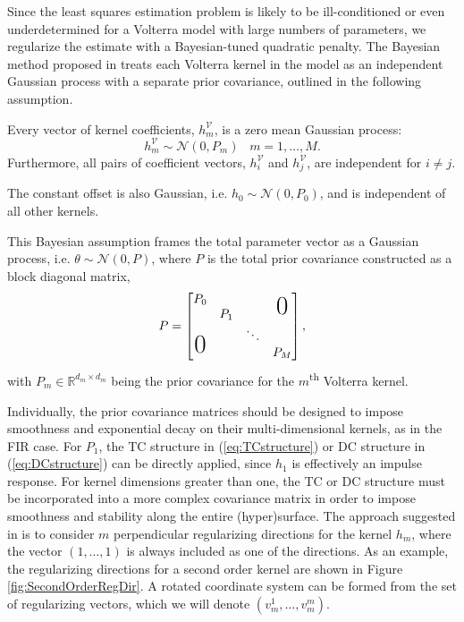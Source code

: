 Since the least squares estimation problem is likely to be ill-conditioned or even underdetermined for a Volterra model with large numbers of parameters, we regularize the estimate with a Bayesian-tuned quadratic penalty. The Bayesian method proposed in \cite{Birpoutsoukis2017} treats each Volterra kernel in the model as an independent Gaussian process with a separate prior covariance, outlined in the following assumption.
\begin{assum}
Every vector of kernel coefficients, $h_m^\mathcal{V}$, is a zero mean Gaussian process: 
\begin{equation}
h_m^\mathcal{V} \sim \mathcal{N}(0,P_m) \; \; \; m = 1, \hdots, M.
\end{equation}
Furthermore, all pairs of coefficient vectors, $h_i^\mathcal{V}$ and $h_j^\mathcal{V}$, are independent for $i \neq j$.

The constant offset is also Gaussian, i.e. $h_0 \sim \mathcal{N}(0,P_0)$, and is independent of all other kernels.
\end{assum}

This Bayesian assumption frames the total parameter vector as a Gaussian process, i.e. $\theta \sim \mathcal{N}(0,P)$, where $P$ is the total prior covariance constructed as a block diagonal matrix,
\begin{equation}
\label{KernelPenalty}
P = \begin{bmatrix}
       P_0 & & &  \multirow{2}{*}{\huge 0} \\
       & P_1 & & \\
      \multirow{2}{*}{\huge 0} & & \ddots & \\
       &  & & P_M
     \end{bmatrix},
\end{equation}
with $P_m \in \mathbb{R}^{d_m \times d_m}$ being the prior covariance for the $m$\textsuperscript{th} Volterra kernel. 

Individually, the prior covariance matrices should be designed to impose smoothness and exponential decay on their multi-dimensional kernels, as in the FIR case. For $P_1$, the TC structure in (\ref{eq:TCstructure}) or DC structure in (\ref{eq:DCstructure}) can be directly applied, since $h_1$ is effectively an impulse response. For kernel dimensions greater than one, the TC or DC structure must be incorporated into a more complex covariance matrix in order to impose smoothness and stability along the entire (hyper)surface. The approach suggested in \cite{Birpoutsoukis2017} is to consider $m$ perpendicular regularizing directions for the kernel $h_m$, where the vector $(1,\hdots,1)$ is always included as one of the directions. As an example, the regularizing directions for a second order kernel are shown in Figure \ref{fig:SecondOrderRegDir}. A rotated coordinate system can be formed from the set of regularizing vectors, which we will denote $(v_m^1, \hdots, v_m^m)$.  

